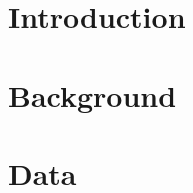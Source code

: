 \documentclass[11pt, english, letterpaper]{article}
\begin{document}
\newpage 

\listoftodos

\newpage



\vspace{-5mm} \section{Introduction}
\label{sec:intro}


\section{Background}
\label{sec:background}


\section{Data}
\label{sec:data}


% 

% 

% 

\newpage
\printbibliography

% 
\end{document}
